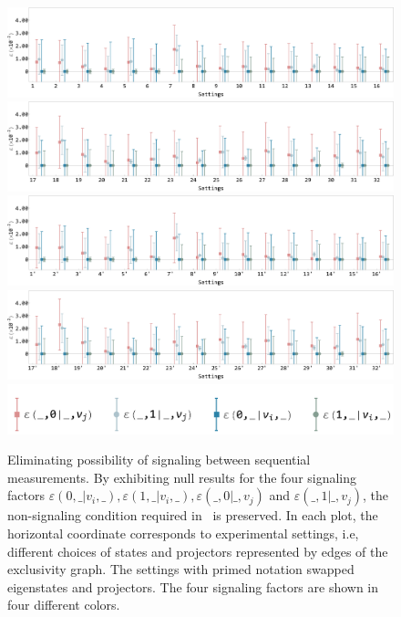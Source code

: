 \documentclass[pra,aps,notitlepage,superscriptaddress,showpacs,showkeys]{revtex4-1}
\theoremstyle{definition}
\theoremstyle{remark}
\begin{document}
 \begin{figure}[t]
     \centering
     \includegraphics[width = .97 \columnwidth]{fig/exp-res-ns/1.pdf}
     \includegraphics[width = .97 \columnwidth]{fig/exp-res-ns/2.pdf}
     \includegraphics[width = .97 \columnwidth]{fig/exp-res-ns/3.pdf}
     \includegraphics[width = .97 \columnwidth]{fig/exp-res-ns/4.pdf}
     \includegraphics[width = .67 \columnwidth]{fig/exp-res-ns/0.pdf}
     \caption{Eliminating possibility of signaling between sequential measurements. By exhibiting null results for the four signaling factors $\varepsilon(0, \_|v_i, \_), \varepsilon(1, \_|v_i, \_), \varepsilon(\_, 0|\_, v_j)$ and $\varepsilon(\_, 1|\_, v_j)$, the non-signaling condition required in~\cite{cabello16s} is preserved. In each plot, the horizontal coordinate corresponds to experimental settings, i.e, different choices of states and projectors represented by edges of the exclusivity graph. The settings with primed notation swapped eigenstates and projectors. The four signaling factors are shown in four different colors.}
     \label{fig:exp-res-0}
 \end{figure}
\end{document}
